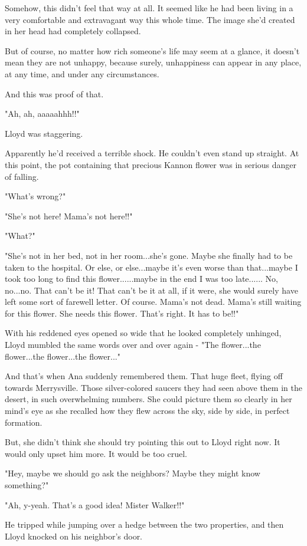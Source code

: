 \documentclass[
]{article}
\begin{document}
Somehow, this didn't feel that way at all. It seemed like he had been
living in a very comfortable and extravagant way this whole time. The
image she'd created in her head had completely collapsed.

But of course, no matter how rich someone's life may seem at a glance,
it doesn't mean they are not unhappy, because surely, unhappiness can
appear in any place, at any time, and under any circumstances.

And this was proof of that.

"Ah, ah, aaaaahhh!!"

Lloyd was staggering.

Apparently he'd received a terrible shock. He couldn't even stand up
straight. At this point, the pot containing that precious Kannon flower
was in serious danger of falling.

"What's wrong?"

"She's not here! Mama's not here!!"

"What?"

"She's not in her bed, not in her room...she's gone. Maybe she finally
had to be taken to the hospital. Or else, or else...maybe it's even
worse than that...maybe I took too long to find this flower......maybe
in the end I was too late...... No, no...no. That can't be it! That
can't be it at all, if it were, she would surely have left some sort of
farewell letter. Of course. Mama's not dead. Mama's still waiting for
this flower. She needs this flower. That's right. It has to be!!"

With his reddened eyes opened so wide that he looked completely
unhinged, Lloyd mumbled the same words over and over again - "The
flower...the flower...the flower...the flower..."

And that's when Ana suddenly remembered them. That huge fleet, flying
off towards Merrysville. Those silver-colored saucers they had seen
above them in the desert, in such overwhelming numbers. She could
picture them so clearly in her mind's eye as she recalled how they flew
across the sky, side by side, in perfect formation.

But, she didn't think she should try pointing this out to Lloyd right
now. It would only upset him more. It would be too cruel.

"Hey, maybe we should go ask the neighbors? Maybe they might know
something?"

"Ah, y-yeah. That's a good idea! Mister Walker!!"

He tripped while jumping over a hedge between the two properties, and
then Lloyd knocked on his neighbor's door.
\end{document}
